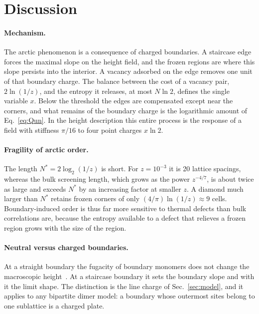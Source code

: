 \documentclass[reprint,aps,pre,superscriptaddress,longbibliography,floatfix,amsmath,amssymb]{revtex4-2}
\newcommand{\Nst}{N^{*}}                 %
\begin{document}
\section{Discussion}\label{sec:discussion}

\paragraph*{Mechanism.} The arctic phenomenon is a consequence of charged boundaries. A staircase edge forces the maximal slope on the height field, and the frozen regions are where this slope persists into the interior. A vacancy adsorbed on the edge removes one unit of that boundary charge. The balance between the cost of a vacancy pair, $2\ln(1/z)$, and the entropy it releases, at most $N\ln2$, defines the single variable $x$. Below the threshold the edges are compensated except near the corners, and what remains of the boundary charge is the logarithmic amount of Eq.~\eqref{eq:Qun}. In the height description this entire process is the response of a field with stiffness $\pi/16$ to four point charges $x\ln2$.

\paragraph*{Fragility of arctic order.} The length $\Nst=2\log_2(1/z)$ is short. For $z=10^{-3}$ it is 20 lattice spacings, whereas the bulk screening length, which grows as the power $z^{-4/7}$, is about twice as large and exceeds $\Nst$ by an increasing factor at smaller $z$. A diamond much larger than $\Nst$ retains frozen corners of only $(4/\pi)\ln(1/z)\approx9$ cells. Boundary-induced order is thus far more sensitive to thermal defects than bulk correlations are, because the entropy available to a defect that relieves a frozen region grows with the size of the region.

\paragraph*{Neutral versus charged boundaries.} At a straight boundary the fugacity of boundary monomers does not change the macroscopic height~\cite{berestycki2023}. At a staircase boundary it sets the boundary slope and with it the limit shape. The distinction is the line charge of Sec.~\ref{sec:model}, and it applies to any bipartite dimer model: a boundary whose outermost sites belong to one sublattice is a charged plate.
\end{document}
